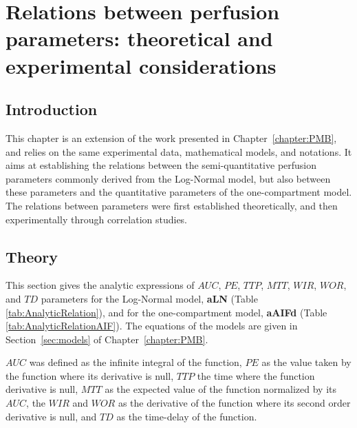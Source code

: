 \chapter{Relations between perfusion parameters: theoretical and experimental considerations}\label{chapter:PMB2}
\section{Introduction}
This chapter is an extension of the work presented in Chapter~\ref{chapter:PMB}, and relies on the same experimental data, mathematical models, and notations.
It aims at establishing the relations between the semi-quantitative perfusion parameters commonly derived from the Log-Normal model, but also between these parameters and the quantitative parameters of the one-compartment model.
The relations between parameters were first established theoretically, and then experimentally through correlation studies.

\section{Theory}
This section gives the analytic expressions of $AUC$, $PE$, $TTP$, $MTT$, $WIR$, $WOR$, and $TD$ parameters for the Log-Normal model, \textbf{aLN} (Table \ref{tab:AnalyticRelation}), and for the one-compartment model, \textbf{aAIFd} (Table \ref{tab:AnalyticRelationAIF}).
The equations of the models are given in Section~\ref{sec:models} of Chapter~\ref{chapter:PMB}.

$AUC$ was defined as the infinite integral of the function, $PE$ as the value taken by the function where its derivative is null, $TTP$ the time where the function derivative is null, $MTT$ as the expected value of the function normalized by its $AUC$, the $WIR$ and $WOR$ as the derivative of the function where its second order derivative is null, and $TD$ as the time-delay of the function.


